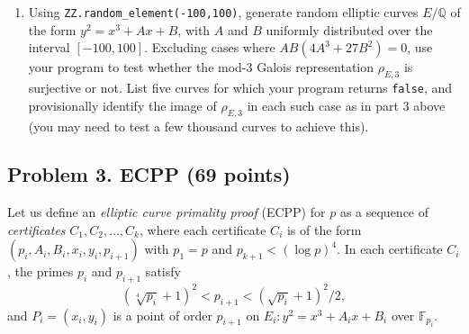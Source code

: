 \documentclass[11pt]{article}
\newcommand{\Q}{\mathbb{Q}}
\theoremstyle{definition}
\begin{document}
\begin{enumerate}[{\bf(a)}]
\item Using \texttt{ZZ.random\_element(-100,100)}, generate random elliptic curves $E/\Q$ of the form $y^2=x^3+Ax+B$, with $A$ and $B$ uniformly distributed over the interval $[-100,100]$.
Excluding cases where $AB(4A^3+27B^2)=0$, use your program to test whether the mod-3 Galois representation $\rho_{E,3}$ is surjective or not.  List five curves for which your program returns \texttt{false}, and provisionally identify the image of $\rho_{E,3}$ in each such case as in part 3 above (you may need to test a few thousand curves to achieve this).
\end{enumerate}


\subsection*{Problem 3. ECPP (69 points)}
Let us define an \emph{elliptic curve primality proof} (ECPP) for $p$ as a sequence of \emph{certificates} $C_1,C_2,\ldots,C_k$, where each certificate $C_i$ is of the form $(p_i,A_i,B_i,x_i,y_i,p_{i+1})$ with $p_1=p$ and $p_{k+1}<(\log p)^4$.
In each certificate $C_i$, the primes $p_i$ and $p_{i+1}$ satisfy
\begin{equation}\label{eq:pibound}
(\sqrt[4]{p_i}+1)^2 < p_{i+1} < (\sqrt{p_i}+1)^2/2,
\end{equation}
and $P_i=(x_i,y_i)$ is a point of order $p_{i+1}$ on $E_i\colon y^2=x^3+A_ix+B_i$ over $\mathbb{F}_{p_i}$.
\end{document}
